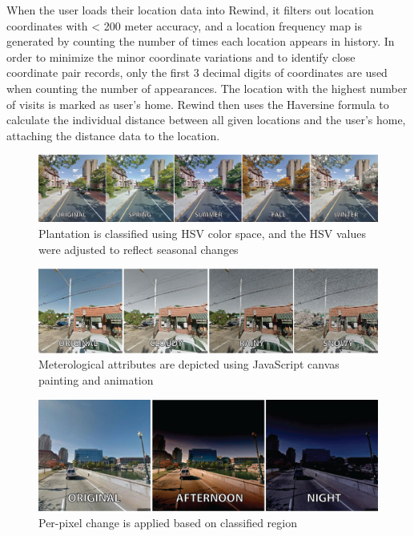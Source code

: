 \documentclass{sigchi}
\begin{document}
When the user loads their location data into Rewind, it filters out location coordinates with < 200 meter accuracy, and a location frequency map is generated by counting the number of times each location appears in history. In order to minimize the minor coordinate variations and to identify close coordinate pair records, only the first 3 decimal digits of coordinates are used when counting the number of appearances. The location with the highest number of visits is marked as user's home. Rewind then uses the Haversine formula to calculate the individual distance between all given locations and the user's home, attaching the distance data to the location.

\begin{figure}
	\centering
	\includegraphics[width=\textwidth]{Rewind-seasons2}
	\caption{Plantation is classified using HSV color space, and the HSV values were adjusted to reflect seasonal changes}
	\label{fig:season}
\end{figure}


\begin{figure}
	\centering
	\includegraphics[width=\textwidth]{Rewind-weather}
	\caption{Meterological attributes are depicted using JavaScript canvas painting and animation}
	\label{fig:weather}
\end{figure}

\begin{figure}
	\centering
	\includegraphics[width=1\linewidth]{Rewind-time_of_day2}
	\caption{Per-pixel change is applied based on classified region}
	\label{fig:timeofday}
\end{figure}
\end{document}
